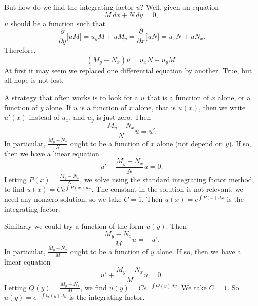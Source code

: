 But how do we find the integrating factor $u$?  Well, given an equation
\begin{equation*}
M \, dx + N \, dy = 0 ,
\end{equation*}
$u$ should be a
function such that
\begin{equation*}
\frac{\partial}{\partial y} \bigl[ u M \bigr] = 
u_y M + u M_y = 
\frac{\partial}{\partial x} \bigl[ u N \bigr] = 
u_x N + u N_x .
\end{equation*}
Therefore,
\begin{equation*}
(M_y-N_x)u = u_x N - u_y M .
\end{equation*}
At first it may seem we replaced one differential equation by another.
True, but all hope is not lost.

A strategy that often works is to look for a $u$ that is a function
of $x$ alone, or a function of $y$ alone.  If $u$ is a function of $x$
alone,
that is $u(x)$, then we write $u'(x)$ instead of $u_x$, and $u_y$ is just
zero.
Then
\begin{equation*}
\frac{M_y-N_x}{N}u = u' .
\end{equation*}
In particular, $\frac{M_y-N_x}{N}$ ought to be a function of $x$ alone (not
depend on $y$).  If so, then we have a linear equation
\begin{equation*}
u' - \frac{M_y-N_x}{N} u = 0 .
\end{equation*}
Letting $P(x) = \frac{M_y-N_x}{N}$,
we solve using the standard integrating factor method,
to find $u(x) = C e^{\int P(x) \, dx}$.  The constant in the
solution is not relevant, we need any nonzero solution,
so we take $C=1$.
Then $u(x) = e^{\int P(x) \, dx}$ is the integrating factor.

Similarly we could try a function of the form $u(y)$.
Then
\begin{equation*}
\frac{M_y-N_x}{M} u = - u' .
\end{equation*}
In particular, $\frac{M_y-N_x}{M}$ ought to be a function of $y$ alone.
If so, then we have a linear equation
\begin{equation*}
u' + \frac{M_y-N_x}{M} u = 0 .
\end{equation*}
Letting $Q(y) = \frac{M_y-N_x}{M}$,
we find $u(y) = C e^{-\int Q(y) \, dy}$.  We
take $C=1$.  So $u(y) = e^{-\int Q(y) \, dy}$ is the integrating factor.

